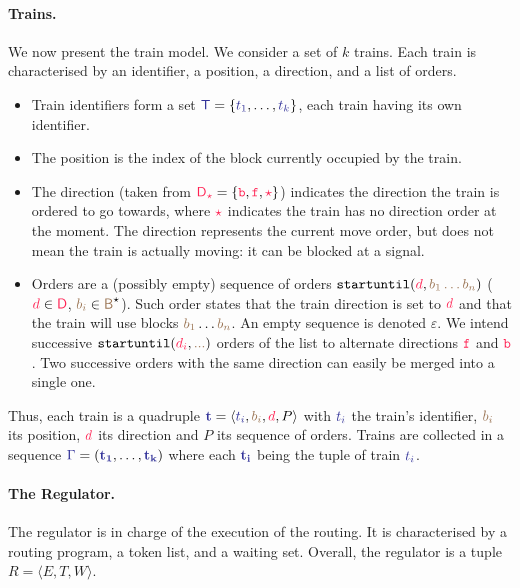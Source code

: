\documentclass[runningheads]{llncs}
\newcommand{\tuple}[1]{\ensuremath{\langle #1\rangle}}
\newcommand{\directions}{\dirFmt{\mathsf{D}}}
\newcommand{\forward}{\ensuremath{\mathtt{f}}}
\newcommand{\backward}{\ensuremath{\mathtt{b}}\xspace}
\newcommand{\dirFmt}[1]{{\color{dircolor} #1}}
\newcommand{\dirForward}{\ensuremath{\dirFmt{\forward}}\xspace}
\newcommand{\dirBackward}{\ensuremath{\dirFmt{\backward}}\xspace}
\newcommand{\dirStop}{\ensuremath{\dirFmt{\star}}\xspace}
\newcommand{\posFmt}[1]{{\color{poscolor}{#1}}}
\newcommand{\blocks}{{\posFmt{\mathsf{B}}}}
\newcommand{\bid}[1]{\ensuremath{\posFmt{b_{#1}}}}
\newcommand{\trainFmt}[1]{{\color{traincolor} #1}}
\newcommand{\trainTuple}[4]{\langle \trainFmt{#1}, \posFmt{#2}, \dirFmt{#3}, #4 \rangle}
\newcommand{\trainSeq}{\ensuremath{\trainFmt{\Gamma}}\xspace}
\newcommand{\trains}{{\trainFmt{\mathsf{T}}}}
\newcommand{\tid}[1]{\ensuremath{\trainFmt{t_{#1}}}}
\newcommand{\su}[2]{{\mbox{$\mathtt{startuntil}(\dirFmt{#1}, \posFmt{#2})$}}\xspace}
\newcommand{\emptyTrainProg}{\varepsilon}
\newcommand{\regTuple}[3]{\tuple{#1, #2, #3}}
\newcommand{\tokens}{\ensuremath{T}}
\begin{document}
\paragraph{Trains.}
We now present the train model. We consider a set of $k$ trains. 
Each train is characterised by an identifier, a position, a direction, and a list of orders. 
\begin{itemize}
	\item Train identifiers form a set  $\trains = \{\tid{1}, \ldots, \tid{k}\}$, each train having its own identifier.
	\item The position is the index of the block currently occupied by the train.
	\item The direction (taken from $\directions_\dirStop = \{\dirBackward, \dirForward, \dirStop\}$) indicates the direction the train is ordered to go towards, where \dirStop indicates the train has no direction order at the moment. The direction represents the current move order, but does not mean the train is actually moving: it can be blocked at a signal.
	\item Orders are a (possibly empty) sequence of orders $\su{d}{\bid{1}\dots\bid{n}}$ ($\dirFmt{d} \in \directions$, $\bid{i} \in \blocks^\star$). Such order states that the train direction is set to $\dirFmt{d}$ and that the train will use blocks $\bid{1}\dots\bid{n}$. An empty sequence is denoted $\emptyTrainProg$. We intend successive \su{d_i}{...} orders of the list to alternate directions \dirForward{} and \dirBackward{}. Two successive orders with the same direction can easily be merged into a single one.
\end{itemize}

Thus, each train is a quadruple $\trainFmt{{\bf t}} = \trainTuple{\tid{i}}{\bid{i}}{d}{P}$ with $\tid{i}$ the train's identifier, $\bid{i}$ its position, $\dirFmt{d}$ its direction and $P$ its sequence of orders. Trains are collected in a sequence $\trainSeq = (\trainFmt{{\bf t_1}}, \ldots, \trainFmt{{\bf t_k}})$ where each $\trainFmt{{\bf t_i}}$ being the tuple of train $\trainFmt{\tid{i}}$. 


\paragraph{The Regulator.}
The regulator is in charge of the execution of the routing. It is characterised by a routing program, a token list, and a waiting set. Overall, the regulator is a tuple $R = \regTuple{E}{\tokens}{W}$. 
\end{document}

